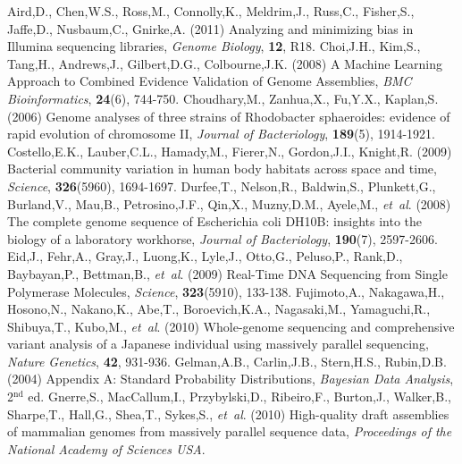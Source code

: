 \documentclass[phd,tocprelim]{cornell}
\begin{document}
%

\begin{thebibliography}{}


 Aird,D., Chen,W.S., Ross,M., Connolly,K., Meldrim,J., Russ,C., Fisher,S., Jaffe,D., Nusbaum,C., Gnirke,A. (2011) Analyzing and minimizing bias in Illumina sequencing libraries, {\it Genome Biology}, {\bf 12}, R18.
 Choi,J.H., Kim,S., Tang,H., Andrews,J., Gilbert,D.G., Colbourne,J.K. (2008) A Machine Learning Approach to Combined Evidence Validation of Genome Assemblies, {\it BMC Bioinformatics}, {\bf 24}(6), 744-750.
 Choudhary,M., Zanhua,X., Fu,Y.X., Kaplan,S. (2006) Genome analyses of three strains of Rhodobacter sphaeroides: evidence of rapid evolution of chromosome II, {\it Journal of Bacteriology}, {\bf 189}(5), 1914-1921.
 Costello,E.K., Lauber,C.L., Hamady,M., Fierer,N., Gordon,J.I., Knight,R. (2009) Bacterial community variation in human body habitats across space and time, {\it Science}, {\bf 326}(5960), 1694-1697.
 Durfee,T., Nelson,R., Baldwin,S., Plunkett,G., Burland,V., Mau,B., Petrosino,J.F., Qin,X., Muzny,D.M., Ayele,M., {\it et~al}. (2008) The complete genome sequence of Escherichia coli DH10B: insights into the biology of a laboratory workhorse, {\it Journal of Bacteriology}, {\bf 190}(7), 2597-2606.
 Eid,J., Fehr,A., Gray,J., Luong,K., Lyle,J., Otto,G., Peluso,P., Rank,D., Baybayan,P., Bettman,B., {\it et~al}. (2009) Real-Time DNA Sequencing from Single Polymerase Molecules, {\it Science}, {\bf 323}(5910), 133-138.
 Fujimoto,A., Nakagawa,H., Hosono,N., Nakano,K., Abe,T., Boroevich,K.A., Nagasaki,M., Yamaguchi,R., Shibuya,T., Kubo,M., {\it et~al}. (2010) Whole-genome sequencing and comprehensive variant analysis of a Japanese individual using massively parallel sequencing, {\it Nature Genetics}, {\bf 42}, 931-936.
 Gelman,A.B., Carlin,J.B., Stern,H.S., Rubin,D.B. (2004) Appendix A: Standard Probability Distributions, {\it Bayesian Data Analysis}, 2$^{\text{nd}}$ ed.
 Gnerre,S., MacCallum,I., Przybylski,D., Ribeiro,F., Burton,J., Walker,B., Sharpe,T., Hall,G., Shea,T., Sykes,S., {\it et~al}. (2010) High-quality draft assemblies of mammalian genomes from massively parallel sequence data, {\it Proceedings of the National Academy of Sciences USA}.

\end{thebibliography}
\end{document}
